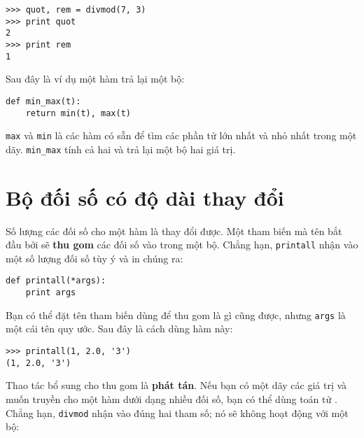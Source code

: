 \documentclass[11pt]{book}
\begin{document}
\beforeverb
\begin{verbatim}
>>> quot, rem = divmod(7, 3)
>>> print quot
2
>>> print rem
1
\end{verbatim}
\afterverb
%
Sau đây là ví dụ một hàm trả lại một bộ:

\beforeverb
\begin{verbatim}
def min_max(t):
    return min(t), max(t)
\end{verbatim}
\afterverb
%
{\tt max} và {\tt min} là các hàm có sẵn để tìm
các phần tử lớn nhất và nhỏ nhất trong một dãy.  \verb"min_max"
tính cả hai và trả lại một bộ hai giá trị.



\section{Bộ đối số có độ dài thay đổi}


Số lượng các đối số cho một hàm là thay đổi được. Một tham biến
mà tên bắt đầu bởi {\tt *} sẽ {\bf thu gom} các đối số vào trong
một bộ. Chẳng hạn, {\tt printall} nhận vào một số lượng 
đối số tùy ý và in chúng ra:

\beforeverb
\begin{verbatim}
def printall(*args):
    print args
\end{verbatim}
\afterverb
%
Bạn có thể đặt tên tham biến dùng để thu gom là gì cũng được, nhưng
{\tt args} là một cái tên quy ước. Sau đây là cách dùng hàm này:

\beforeverb
\begin{verbatim}
>>> printall(1, 2.0, '3')
(1, 2.0, '3')
\end{verbatim}
\afterverb
%
Thao tác bổ sung cho thu gom là {\bf phát tán}. Nếu bạn có một dãy
các giá trị và muốn truyền cho một hàm dưới dạng nhiều đối số,
bạn có thể dùng toán tử {\tt *}.
Chẳng hạn, {\tt divmod} nhận vào đúng hai tham số; nó sẽ không 
hoạt động với một bộ:


%
\end{document}

